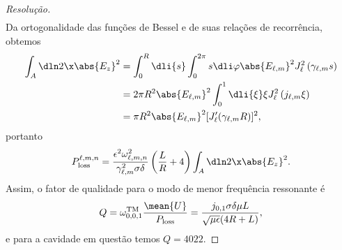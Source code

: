 \begin{proof}[Resolução]
\begin{align*}
    \end{align*}
    Da ortogonalidade das funções de Bessel e de suas relações de recorrência, obtemos
    \begin{align*}
        \int_A \dln2\x\abs{E_z}^2 &= \int_0^R \dli{s} \int_0^{2\pi} s\dli\varphi \abs{E_{\ell,m}}^2J_\ell^2\left(\gamma_{\ell,m} s\right)\\
                                  &= 2\pi R^2 \abs{E_{\ell,m}}^2 \int_0^1 \dli{\xi} \xi J_\ell^2\left(j_{\ell,m} \xi\right)\\
                                  &= \pi R^2 \abs{E_{\ell,m}}^2  [J_\ell'(\gamma_{\ell,m} R)]^2,
    \end{align*}
    portanto
    \begin{equation*}
        P^{\ell,m,n}_\mathrm{loss} = \frac{\epsilon^2 \omega^2_{\ell,m,n}}{\gamma^2_{\ell,m} \sigma \delta} \left(\frac{L}{R} + 4\right)\int_A \dln2\x \abs{E_z}^2.
    \end{equation*}
    Assim, o fator de qualidade para o modo de menor frequência ressonante é
    \begin{equation*}
        Q = \omega^\mathrm{TM}_{0,0,1}\frac{\mean{U}}{P_\mathrm{loss}} = \frac{j_{0,1}\sigma \delta \mu L}{\sqrt{\mu\epsilon} (4R + L)},
    \end{equation*}
    e para a cavidade em questão temos \(Q = 4022.\)
\end{proof}
